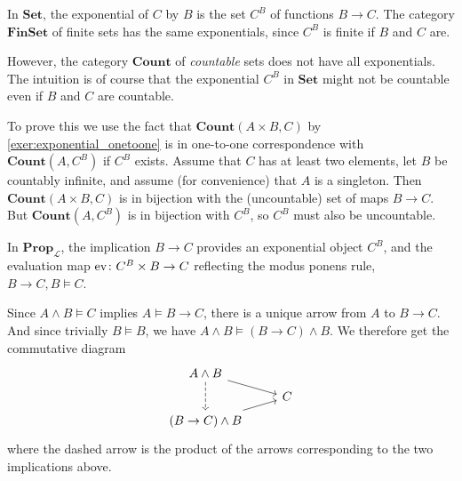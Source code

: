 \documentclass[article, a4paper, 11pt, oneside]{memoir}
\numberwithin{equation}{chapter}
\newcommand{\calL}{\mathcal{L}}
\newcommand{\ncat}[1]{\mathbf{#1}} %
\newcommand{\catSet}{\ncat{Set}}
\newcommand{\catFinSet}{\ncat{FinSet}}
\newcommand{\catProp}{\ncat{Prop}}
\newcommand{\catCount}{\ncat{Count}}
\theoremstyle{myexample}
\theoremstyle{myexamplebreak}
\begin{document}
\begin{examplebreak}
    \begin{enumexample}
        \item In $\catSet$, the exponential of $C$ by $B$ is the set $C^B$ of functions $B \to C$. The category $\catFinSet$ of finite sets has the same exponentials, since $C^B$ is finite if $B$ and $C$ are.
        
        \item However, the category $\catCount$ of \emph{countable} sets does not have all exponentials. The intuition is of course that the exponential $C^B$ in $\catSet$ might not be countable even if $B$ and $C$ are countable.
        
        To prove this we use the fact that $\catCount(A \times B, C)$ by \cref{exer:exponential_onetoone} is in one-to-one correspondence with $\catCount(A, C^B)$ if $C^B$ exists. Assume that $C$ has at least two elements, let $B$ be countably infinite, and assume (for convenience) that $A$ is a singleton. Then $\catCount(A \times B, C)$ is in bijection with the (uncountable) set of maps $B \to C$. But $\catCount(A, C^B)$ is in bijection with $C^B$, so $C^B$ must also be uncountable.

        \item In $\catProp_\calL$, the implication $B \to C$ provides an exponential object $C^B$, and the evaluation map $\mathrm{ev} \colon C^B \times B \to C$ reflecting the modus ponens rule, $B \to C, B \vDash C$.
        
        Since $A \land B \vDash C$ implies $A \vDash B \to C$, there is a unique arrow from $A$ to $B \to C$. And since trivially $B \vDash B$, we have $A \land B \vDash (B \to C) \land B$. We therefore get the commutative diagram
        \begin{equation*}
            \begin{tikzcd}[row sep=tiny]
                A \land B
                    \ar[dd, dashed]
                    \ar[dr]
                \\
                & C
                \\
                (B \to C) \land B
                    \ar[ur]
            \end{tikzcd}
        \end{equation*}
        where the dashed arrow is the product of the arrows corresponding to the two implications above.
    \end{enumexample}
\end{examplebreak}
\end{document}
